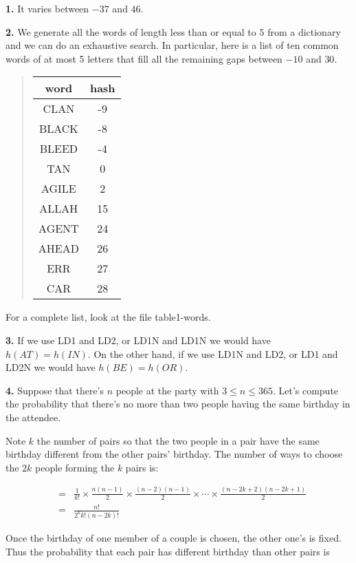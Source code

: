 \documentclass[a4paper,12pt]{article}
\newcommand{\newpar}[1]{\bigskip \noindent \textbf{#1.}}
\begin{document}
\newpar{1} It varies between $-37$ and $46$.

\newpar{2} We generate all the words of length less than or equal to
$5$ from a dictionary and we can do an exhaustive search.  In
particular, here is a list of ten common words of at most 5 letters
that fill all the remaining gaps between $-10$ and $30$.

\begin{quote}
  \begin{tabular}{|c|c|}
    \hline word & hash \\
    \hline CLAN & -9 \\
    BLACK & -8 \\
    BLEED & -4 \\
    TAN & 0 \\
    AGILE & 2 \\
    ALLAH & 15 \\
    AGENT & 24 \\
    AHEAD & 26 \\
    ERR & 27 \\
    CAR & 28 \\
    \hline
  \end{tabular}
\end{quote}

For a complete list, look at the file table1-words.

\newpar{3}
If we use LD1 and LD2, or LD1N and LD1N we would have $h(AT) =
h(IN)$.  On the other hand, if we use LD1N and LD2, or LD1 and LD2N we
would have $h(BE) = h(OR)$.

\newpar{4}
Suppose that there's $n$ people at the party with $3 \le n\le 365$.
Let's compute the probability that there's no more than two people
having the same birthday in the attendee.

Note $k$ the number of pairs so that the two people in a pair have the
same birthday different from the other pairs' birthday.  The number of
ways to choose the $2k$ people forming the $k$ pairs is:

\begin{eqnarray*}
&=& \frac{1}{k!}\times \frac{n(n-1)}{2} \times \frac{(n-2)(n-1)}{2}
\times \cdots \times \frac{(n-2k+2)(n-2k+1)}{2} \\
&=& \frac{n!}{2^k k!(n-2k)!}
\end{eqnarray*}

Once the birthday of one member of a
couple is chosen, the other one's is fixed.  Thus the probability that
each pair has different birthday than other pairs is
\end{document}
